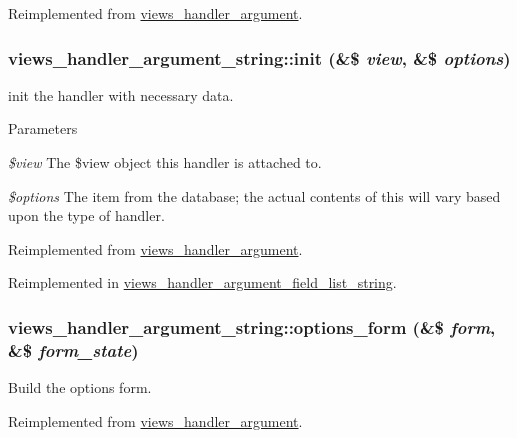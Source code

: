 Reimplemented from \hyperlink{classviews__handler__argument_a9fad9ab1a7aaa5915baf13a2872faa70}{views\_\-handler\_\-argument}.\hypertarget{classviews__handler__argument__string_a504dc70451721c2b9ccae44240d13e2e}{
\subsubsection[{init}]{\setlength{\rightskip}{0pt plus 5cm}views\_\-handler\_\-argument\_\-string::init (\&\$ {\em view}, \/  \&\$ {\em options})}}
\label{classviews__handler__argument__string_a504dc70451721c2b9ccae44240d13e2e}
init the handler with necessary data. 
\begin{DoxyParams}{Parameters}
\item[{\em \$view}]The \$view object this handler is attached to. \item[{\em \$options}]The item from the database; the actual contents of this will vary based upon the type of handler. \end{DoxyParams}


Reimplemented from \hyperlink{classviews__handler__argument_a2c7e59a9df090d59d9d7d2827b6da85a}{views\_\-handler\_\-argument}.

Reimplemented in \hyperlink{classviews__handler__argument__field__list__string_a3f56fc3681ce2363758ab69821b74885}{views\_\-handler\_\-argument\_\-field\_\-list\_\-string}.\hypertarget{classviews__handler__argument__string_ab96e2120f4f4458921f817b343d11ef0}{
\subsubsection[{options\_\-form}]{\setlength{\rightskip}{0pt plus 5cm}views\_\-handler\_\-argument\_\-string::options\_\-form (\&\$ {\em form}, \/  \&\$ {\em form\_\-state})}}
\label{classviews__handler__argument__string_ab96e2120f4f4458921f817b343d11ef0}
Build the options form. 

Reimplemented from \hyperlink{classviews__handler__argument_a44f015a0d527983ae6df2689f66b2c24}{views\_\-handler\_\-argument}.

